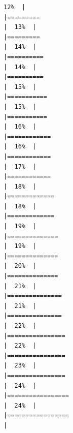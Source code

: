\documentclass[
  english,
  man,a4paper,mask,floatsintext]{apa6}
\begin{document}
\begin{verbatim}
12%  |                                                                              |=========                                                             |  13%  |                                                                              |=========                                                             |  14%  |                                                                              |==========                                                            |  14%  |                                                                              |==========                                                            |  15%  |                                                                              |===========                                                           |  15%  |                                                                              |===========                                                           |  16%  |                                                                              |============                                                          |  16%  |                                                                              |============                                                          |  17%  |                                                                              |============                                                          |  18%  |                                                                              |=============                                                         |  18%  |                                                                              |=============                                                         |  19%  |                                                                              |==============                                                        |  19%  |                                                                              |==============                                                        |  20%  |                                                                              |==============                                                        |  21%  |                                                                              |===============                                                       |  21%  |                                                                              |===============                                                       |  22%  |                                                                              |================                                                      |  22%  |                                                                              |================                                                      |  23%  |                                                                              |================                                                      |  24%  |                                                                              |=================                                                     |  24%  |                                                                              |=================                                                     |  
\end{verbatim}
\end{document}
